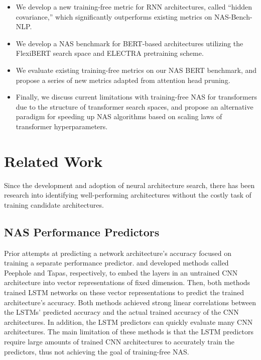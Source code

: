 \documentclass[11pt]{article}
\begin{document}
    \begin{itemize}[leftmargin=*]
        \setlength{\itemsep}{-0.2em}
        \item We develop a new training-free metric for RNN architectures, called ``hidden covariance,'' which significantly outperforms existing metrics on NAS-Bench-NLP.
        \item We develop a NAS benchmark for BERT-based architectures utilizing the FlexiBERT search space and ELECTRA pretraining scheme.
        \item We evaluate existing training-free metrics on our NAS BERT benchmark, and propose a series of new metrics adapted from attention head pruning.
        \item Finally, we discuss current limitations with training-free NAS for transformers due to the structure of transformer search spaces, and propose an alternative paradigm for speeding up NAS algorithms based on scaling laws of transformer hyperparameters.
    \end{itemize}

\section{Related Work}
    Since the development and adoption of neural architecture search, there has been research into identifying well-performing architectures without the costly task of training candidate architectures.
    
\subsection{NAS Performance Predictors}
    Prior attempts at predicting a network architecture's accuracy focused on training a separate performance predictor. \citet{deng_peephole_2017} and \citet{istrate_tapas_2019} developed methods called Peephole and Tapas, respectively, to embed the layers in an untrained CNN architecture into vector representations of fixed dimension. Then, both methods trained LSTM networks on these vector representations to predict the trained architecture's accuracy. Both methods achieved strong linear correlations between the LSTMs' predicted accuracy and the actual trained accuracy of the CNN architectures. In addition, the LSTM predictors can quickly evaluate many CNN architectures. The main limitation of these methods is that the LSTM predictors require large amounts of trained CNN architectures to accurately train the predictors, thus not achieving the goal of training-free NAS. 
\end{document}
